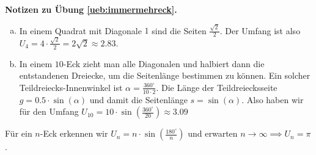 \documentclass[%
11pt,%
twoside,%
titlepage,%
swissgerman,%
headsepline%
]{scrartcl}
\newcommand{\faReturnGray}{\textcolor{gray}{\faMailReply}} %
\theoremstyle{definition}
\theoremstyle{plain}
\newcommand{\concatueb}[1]{ueb:#1}%
\newcommand{\concatlsg}[1]{lsg:#1}%
\newenvironment{lsg}[1]{%
    \par\noindent\textbf{Notizen zu Übung \ref{\concatueb{#1}}.}%
    \label{\concatlsg{#1}} %
    \hfill\hyperref[\concatueb{#1}]{\faReturnGray}\par %
}{%
    \par%
}
\begin{document}
\begin{lsg}{immermehreck}
\begin{enumerate}[a)]
\item In einem Quadrat mit Diagonale $1$ sind die Seiten $\frac{\sqrt{2}}{2}$. Der Umfang ist also $U_{4}=4\cdot\frac{\sqrt{2}}{2}=2\sqrt{2}\approx2.83$.
\item In einem $10$-Eck zieht man alle Diagonalen und halbiert dann die entstandenen Dreiecke, um die Seitenl\"ange bestimmen zu k\"onnen. Ein solcher Teildreiecks-Innenwinkel ist $\alpha=\frac{360^{\circ}}{10\cdot2}$. Die L\"ange der Teildreiecksseite $g=0.5\cdot\sin(\alpha)$ und damit die Seitenl\"ange $s=\sin(\alpha)$. Also haben wir f\"ur den Umfang $U_{10}=10\cdot\sin(\frac{360^{\circ}}{20})\approx3.09$
\end{enumerate}
F\"ur ein $n$-Eck erkennen wir $U_{n}=n\cdot\sin(\frac{180^{\circ}}{n})$ und erwarten $n\to\infty\implies U_{n}=\pi$.
\end{lsg}
\end{document}
